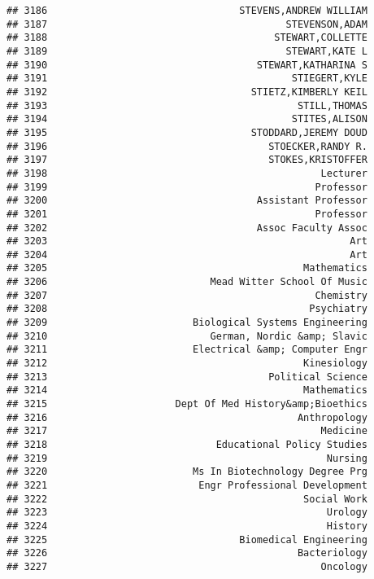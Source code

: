 \documentclass[
]{article}
\begin{document}
\begin{verbatim}
## 3186                                 STEVENS,ANDREW WILLIAM
## 3187                                         STEVENSON,ADAM
## 3188                                       STEWART,COLLETTE
## 3189                                         STEWART,KATE L
## 3190                                    STEWART,KATHARINA S
## 3191                                          STIEGERT,KYLE
## 3192                                   STIETZ,KIMBERLY KEIL
## 3193                                           STILL,THOMAS
## 3194                                          STITES,ALISON
## 3195                                   STODDARD,JEREMY DOUD
## 3196                                      STOECKER,RANDY R.
## 3197                                      STOKES,KRISTOFFER
## 3198                                               Lecturer
## 3199                                              Professor
## 3200                                    Assistant Professor
## 3201                                              Professor
## 3202                                    Assoc Faculty Assoc
## 3203                                                    Art
## 3204                                                    Art
## 3205                                            Mathematics
## 3206                            Mead Witter School Of Music
## 3207                                              Chemistry
## 3208                                             Psychiatry
## 3209                         Biological Systems Engineering
## 3210                            German, Nordic &amp; Slavic
## 3211                         Electrical &amp; Computer Engr
## 3212                                            Kinesiology
## 3213                                      Political Science
## 3214                                            Mathematics
## 3215                      Dept Of Med History&amp;Bioethics
## 3216                                           Anthropology
## 3217                                               Medicine
## 3218                             Educational Policy Studies
## 3219                                                Nursing
## 3220                         Ms In Biotechnology Degree Prg
## 3221                          Engr Professional Development
## 3222                                            Social Work
## 3223                                                Urology
## 3224                                                History
## 3225                                 Biomedical Engineering
## 3226                                           Bacteriology
## 3227                                               Oncology

\end{verbatim}
\end{document}
